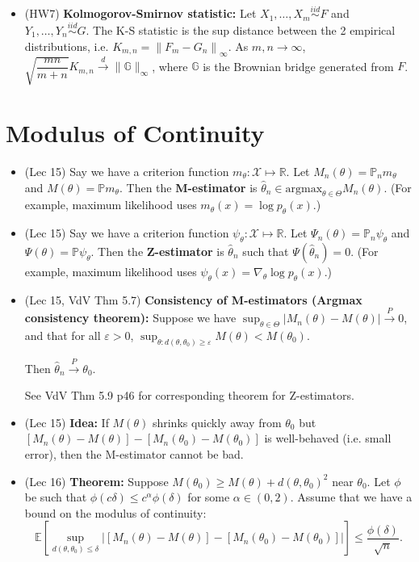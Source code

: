 \documentclass[twoside]{article}
\newcommand{\dis}{\displaystyle}
\newcommand{\norm}[1]{\left\|{#1}\right\|} %
\newcommand\bbE{\mathbb{E}}
\newcommand\bbG{\mathbb{G}}
\newcommand\bbP{\mathbb{P}}
\newcommand\bbR{\mathbb{R}}
\newcommand\calX{\mathcal{X}}
\newcommand\dlt{\delta}
\def\eps{\varepsilon}
\def\t{\theta}
\newcommand\T{\Theta}
\newcommand\cd{\stackrel{d}{\goesto}}
\newcommand\cp{\stackrel{P}{\goesto}}
\newcommand\goesto{\rightarrow}
\begin{document}
\begin{itemize}
\item (HW7) \textbf{Kolmogorov-Smirnov statistic:} Let $X_1, \dots, X_m \stackrel{iid}{\sim} F$ and $Y_1, \dots, Y_n \stackrel{iid}{\sim} G$. The K-S statistic is the sup distance between the 2 empirical distributions, i.e. $K_{m,n} = \norm{F_m - G_n}_\infty$. As $m, n \goesto \infty$, $\sqrt{\dfrac{mn}{m+n}} K_{m,n} \cd \| \bbG \|_\infty$, where $\bbG$ is the Brownian bridge generated from $F$.

\end{itemize}

\section{Modulus of Continuity}
\begin{itemize}
\item (Lec 15) Say we have a criterion function $m_\t: \calX \mapsto \bbR$. Let $M_n(\t) = \bbP_n m_\t$ and $M(\t) = \bbP m_\t$. Then the \textbf{M-estimator} is $\hat{\t}_n \in \text{argmax}_{\t \in \T} M_n(\t)$. (For example, maximum likelihood uses $m_\t(x) = \log p_\t(x)$.)

\item (Lec 15) Say we have a criterion function $\psi_\t: \calX \mapsto \bbR$. Let $\Psi_n(\t) = \bbP_n \psi_\t$ and $\Psi(\t) = \bbP \psi_\t$. Then the \textbf{Z-estimator} is $\hat{\t}_n$ such that $\Psi(\hat{\t}_n) = 0$. (For example, maximum likelihood uses $\psi_\t(x) = \nabla_\t \log p_\t(x)$.)

\item (Lec 15, VdV Thm 5.7) \textbf{Consistency of M-estimators (Argmax consistency theorem):} Suppose we have $\dis\sup_{\t \in \T} |M_n(\t) - M(\t)| \cp 0$, and that for all $\eps > 0$, $\dis\sup_{\t: d(\t, \t_0) \geq \eps} M(\t) < M(\t_0)$.

Then $\hat{\t}_n \cp \t_0$.

See VdV Thm 5.9 p46 for corresponding theorem for Z-estimators.

\item (Lec 15) \textbf{Idea:} If $M(\t)$ shrinks quickly away from $\t_0$ but $[M_n(\t)-M(\t)] - [M_n(\t_0) - M(\t_0)]$ is well-behaved (i.e. small error), then the M-estimator cannot be bad.

\item (Lec 16) \textbf{Theorem:} Suppose $M(\t_0) \geq M(\t) + d(\t,\t_0)^2$ near $\t_0$. Let $\phi$ be such that $\phi(c\dlt)\leq c^{\alpha} \phi(\dlt)$ for some $\alpha \in (0,2)$. Assume that we have a bound on the modulus of continuity:
\[
\bbE \left[ \sup_{d(\t,\t_0)\leq \dlt} \Bigg| [M_n(\t) - M(\t)] - [M_n (\t_0) - M(\t_0)]
\Bigg|\right] \leq \frac{\phi(\dlt)}{\sqrt{n}}.
\]


\end{itemize}
\end{document}
